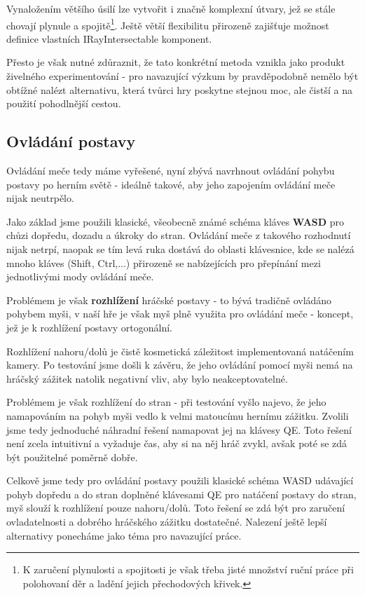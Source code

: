 Vynaložením většího úsilí lze vytvořit i značně komplexní útvary, jež se stále chovají plynule a spojitě\footnote{K zaručení plynulosti a spojitosti je však třeba jisté množství ruční práce při polohovaní děr a ladění jejich přechodových křivek.}. Ještě větší flexibilitu přirozeně zajišťuje možnost definice vlastních IRayIntersectable komponent. 

Přesto je však nutné zdůraznit, že tato konkrétní metoda vznikla jako produkt živelného experimentování - pro navazující výzkum by pravděpodobně nemělo být obtížné nalézt alternativu, která tvůrci hry poskytne stejnou moc, ale čistší a na použití pohodlnější cestou. 

\subsection{Ovládání postavy}

Ovládání meče tedy máme vyřešené, nyní zbývá navrhnout ovládání pohybu postavy po herním světě - ideálně takové, aby jeho zapojením ovládání meče nijak neutrpělo. 

Jako základ jsme použili klasické, všeobecně známé schéma kláves \textbf{WASD} pro chůzi dopředu, dozadu a úkroky do stran. Ovládání meče z takového rozhodnutí nijak netrpí, naopak se tím levá ruka dostává do oblasti klávesnice, kde se nalézá mnoho kláves (Shift, Ctrl,...) přirozeně se nabízejících pro přepínání mezi jednotlivými mody ovládání meče.

Problémem je však \textbf{rozhlížení} hráčské postavy - to bývá tradičně ovládáno pohybem myši, v naší hře je však myš plně využita pro ovládání meče - koncept, jež je k rozhlížení postavy ortogonální. 

Rozhlížení nahoru/dolů je čistě kosmetická záležitost implementovaná natáčením kamery. Po testování jsme došli k závěru, že jeho ovládání pomocí myši nemá na hráčský zážitek natolik negativní vliv, aby bylo neakceptovatelné. 

Problémem je však rozhlížení do stran - při testování vyšlo najevo, že jeho namapováním na pohyb myši vedlo k velmi matoucímu hernímu zážitku. Zvolili jsme tedy jednoduché náhradní řešení namapovat jej na klávesy QE. Toto řešení není zcela intuitivní a vyžaduje čas, aby si na něj hráč zvykl, avšak poté se zdá být použitelné poměrně dobře.

\bigbreak
Celkově jsme tedy pro ovládání postavy použili klasické schéma WASD udávající pohyb dopředu a do stran doplněné klávesami QE pro natáčení postavy do stran, myš slouží k rozhlížení pouze nahoru/dolů. Toto řešení se zdá být pro zaručení ovladatelnosti a dobrého hráčského zážitku dostatečné. Nalezení ještě lepší alternativy ponecháme jako téma pro navazující práce.

